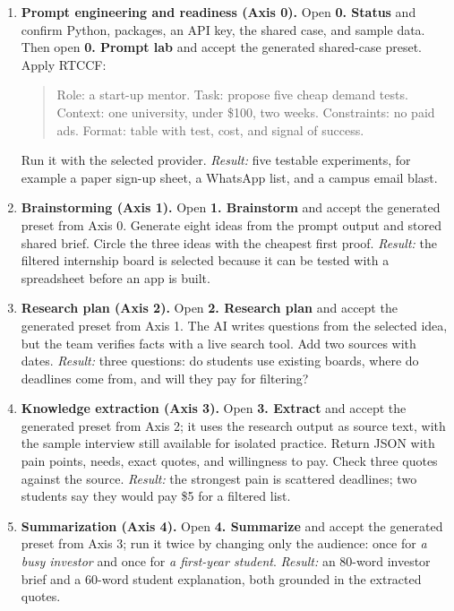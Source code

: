 \documentclass[11pt,a4paper]{article}
\begin{document}
\begin{enumerate}[label=\textbf{Axis \arabic*}, leftmargin=2.1cm]

\item \textbf{Prompt engineering and readiness (Axis 0).}
Open \textbf{0. Status} and confirm Python, packages, an API key, the shared case, and sample data. Then open \textbf{0. Prompt lab} and accept the generated shared-case preset. Apply RTCCF:
\begin{quote}
Role: a start-up mentor. Task: propose five cheap demand tests. Context: one university, under \$100, two weeks. Constraints: no paid ads. Format: table with test, cost, and signal of success.
\end{quote}
Run it with the selected provider. \emph{Result:} five testable experiments, for example a paper sign-up sheet, a WhatsApp list, and a campus email blast.

\item \textbf{Brainstorming (Axis 1).}
Open \textbf{1. Brainstorm} and accept the generated preset from Axis 0. Generate eight ideas from the prompt output and stored shared brief. Circle the three ideas with the cheapest first proof. \emph{Result:} the filtered internship board is selected because it can be tested with a spreadsheet before an app is built.

\item \textbf{Research plan (Axis 2).}
Open \textbf{2. Research plan} and accept the generated preset from Axis 1. The AI writes questions from the selected idea, but the team verifies facts with a live search tool. Add two sources with dates. \emph{Result:} three questions: do students use existing boards, where do deadlines come from, and will they pay for filtering?

\item \textbf{Knowledge extraction (Axis 3).}
Open \textbf{3. Extract} and accept the generated preset from Axis 2; it uses the research output as source text, with the sample interview still available for isolated practice. Return JSON with pain points, needs, exact quotes, and willingness to pay. Check three quotes against the source. \emph{Result:} the strongest pain is scattered deadlines; two students say they would pay \$5 for a filtered list.

\item \textbf{Summarization (Axis 4).}
Open \textbf{4. Summarize} and accept the generated preset from Axis 3; run it twice by changing only the audience: once for \emph{a busy investor} and once for \emph{a first-year student}. \emph{Result:} an 80-word investor brief and a 60-word student explanation, both grounded in the extracted quotes.


\end{enumerate}
\end{document}
